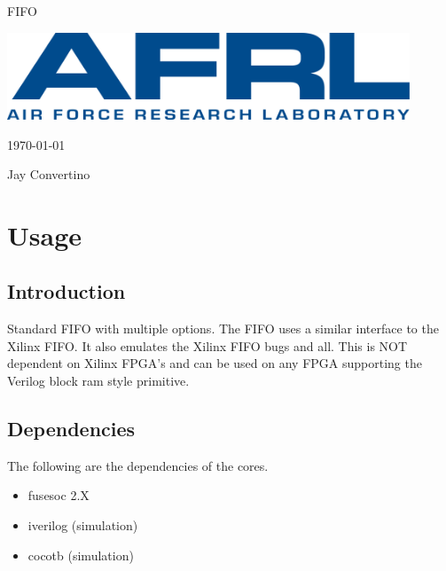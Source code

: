 \begin{titlepage}
  \begin{center}

  {\Huge FIFO}

  \vspace{25mm}

  \includegraphics[width=0.90\textwidth,height=\textheight,keepaspectratio]{img/AFRL.png}

  \vspace{25mm}

  \today

  \vspace{15mm}

  {\Large Jay Convertino}

  \end{center}
\end{titlepage}

\tableofcontents

\newpage

\section{Usage}

\subsection{Introduction}

\par
Standard FIFO with multiple options. The FIFO uses a similar interface to the Xilinx FIFO.
It also emulates the Xilinx FIFO bugs and all. This is NOT dependent on Xilinx FPGA's and
can be used on any FPGA supporting the Verilog block ram style primitive.

\subsection{Dependencies}

\par
The following are the dependencies of the cores.

\begin{itemize}
  \item fusesoc 2.X
  \item iverilog (simulation)
  \item cocotb (simulation)
\end{itemize}


